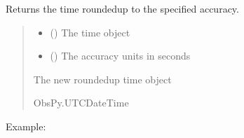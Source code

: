 \documentclass[letterpaper,10pt,english]{sphinxmanual}
\begin{document}

\begin{fulllineitems}
\label{\detokenize{api_core:amw.core.utils.time_ceil}}
\pysigstartsignatures
{}
\pysigstopsignatures
\sphinxAtStartPar
Returns the time rounded\sphinxhyphen{}up to the specified accuracy.
\begin{quote}\begin{description}
\begin{itemize}
\item {} 
\sphinxAtStartPar
{} () \textendash{} The time object

\item {} 
\sphinxAtStartPar
{} () \textendash{} The accuracy units in seconds

\end{itemize}

\sphinxAtStartPar
The new rounded\sphinxhyphen{}up time object

\sphinxAtStartPar
ObsPy.UTCDateTime

\end{description}\end{quote}

\sphinxAtStartPar
Example:


\end{fulllineitems}
\end{document}
